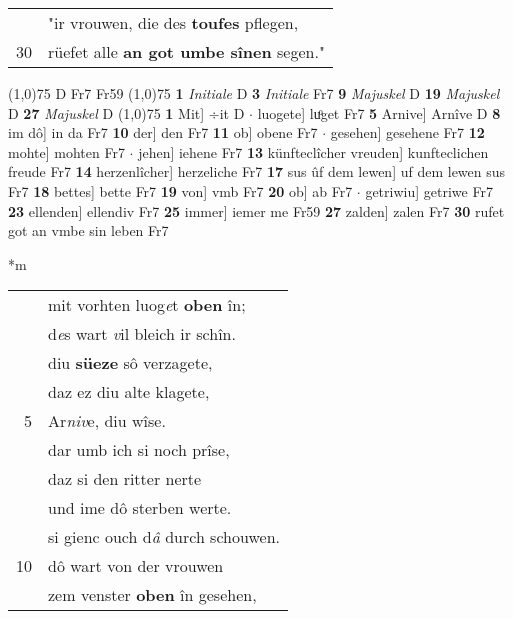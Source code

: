 \documentclass[8pt,a4paper,notitlepage]{article}
\begin{document}
\begin{table}[ht]
\begin{minipage}[t]{0.5\linewidth}
\begin{tabular}{rl}
 & "ir vrouwen, die des \textbf{toufes} pflegen,\\ 
30 & rüefet alle \textbf{an got umbe sînen} segen."\\ 
\end{tabular}
\scriptsize
\line(1,0){75} \newline
D Fr7 Fr59 \newline
\line(1,0){75} \newline
\textbf{1} \textit{Initiale} D  \textbf{3} \textit{Initiale} Fr7  \textbf{9} \textit{Majuskel} D  \textbf{19} \textit{Majuskel} D  \textbf{27} \textit{Majuskel} D  \newline
\line(1,0){75} \newline
\textbf{1} Mit] ÷it D  $\cdot$ luogete] luͦget Fr7 \textbf{5} Arnive] Arnîve D \textbf{8} im dô] in da Fr7 \textbf{10} der] den Fr7 \textbf{11} ob] obene Fr7  $\cdot$ gesehen] gesehene Fr7 \textbf{12} mohte] mohten Fr7  $\cdot$ jehen] iehene Fr7 \textbf{13} künfteclîcher vreuden] kunfteclichen freude Fr7 \textbf{14} herzenlîcher] herzeliche Fr7 \textbf{17} sus ûf dem lewen] uf dem lewen sus Fr7 \textbf{18} bettes] bette Fr7 \textbf{19} von] vmb Fr7 \textbf{20} ob] ab Fr7  $\cdot$ getriwiu] getriwe Fr7 \textbf{23} ellenden] ellendiv Fr7 \textbf{25} immer] iemer me Fr59 \textbf{27} zalden] zalen Fr7 \textbf{30} rufet got an vmbe sin leben Fr7 \newline
\end{minipage}
\hspace{0.5cm}
\begin{minipage}[t]{0.5\linewidth}
\small
\begin{center}*m
\end{center}
\begin{tabular}{rl}
 & mit vorhten luog\textit{e}t \textbf{oben} în;\\ 
 & d\textit{e}s wart \textit{v}il bleich ir schîn.\\ 
 & diu \textbf{süeze} sô verzagete,\\ 
 & daz ez diu alte klagete,\\ 
5 & Ar\textit{niv}e, diu wîse.\\ 
 & dar umb ich si noch prîse,\\ 
 & daz si den ritter nerte\\ 
 & und ime dô sterben werte.\\ 
 & si gienc ouch d\textit{â} durch schouwen.\\ 
10 & dô wart von der vrouwen\\ 
 & zem venster \textbf{oben} în gesehen,\\ 

\end{tabular}
\end{minipage}
\end{table}
\end{document}
